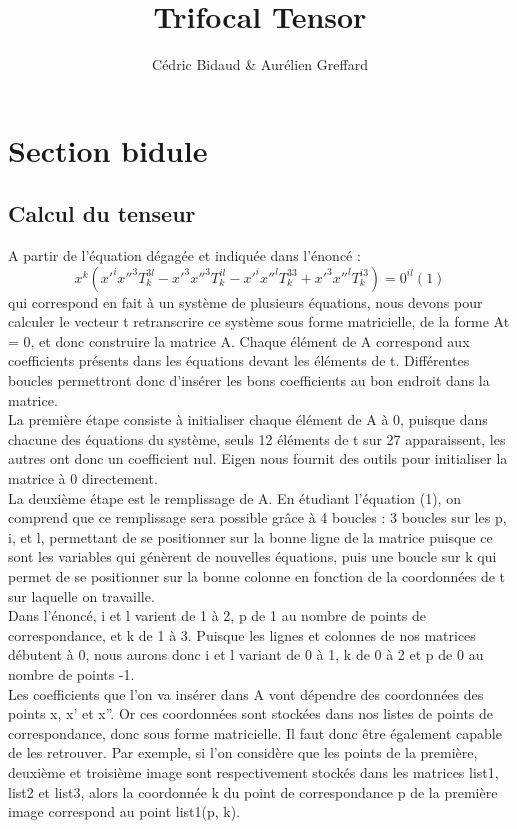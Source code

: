 \documentclass[a4paper,10pt]{report}
\title{Trifocal Tensor}
\author{Cédric Bidaud & Aurélien Greffard}
\begin{document}
\maketitle

\section{Section bidule}
\subsection{Calcul du tenseur}


A partir de l’équation dégagée et indiquée dans l’énoncé :
\[x^{k}(x'^{i}x''^{3}T^{3l}_{k} - x'^{3}x''^{3}T^{il}_{k} - x'^{i}x''^{l}T^{33}_{k} + x'^{3}x''^{l}T^{i3}_{k}) = 0^{il}  (1)\]
qui correspond en fait à un système de plusieurs équations, nous devons pour calculer le vecteur t retranscrire ce système sous forme matricielle, de la forme At = 0, et donc construire la matrice A. Chaque élément de A correspond aux coefficients présents dans les équations devant les éléments de t. Différentes boucles permettront donc d’insérer les bons coefficients au bon endroit dans la matrice.
\\

La première étape consiste à initialiser chaque élément de A à 0, puisque dans chacune des équations du système, seuls 12 éléments de t sur 27 apparaissent, les autres ont donc un coefficient nul. Eigen nous fournit des outils pour initialiser la matrice à 0 directement.
\\

La deuxième étape est le remplissage de A. En étudiant l’équation (1), on comprend que ce remplissage sera possible grâce à 4 boucles : 3 boucles sur les p, i, et l, permettant de se positionner sur la bonne ligne de la matrice puisque ce sont les variables qui génèrent de nouvelles équations, puis une boucle sur k qui permet de se positionner sur la bonne colonne en fonction de la coordonnées de t sur laquelle on travaille.
\\

Dans l’énoncé, i et l varient de 1 à 2, p de 1 au nombre de points de correspondance, et k de 1 à 3. Puisque les lignes et colonnes de nos matrices débutent à 0, nous aurons donc i et l variant de 0 à 1, k de 0 à 2 et p de 0 au nombre de points -1.
\\

Les coefficients que l’on va insérer dans A vont dépendre des coordonnées des points x, x’ et x”. Or ces coordonnées sont stockées dans nos listes de points de correspondance, donc sous forme matricielle. Il faut donc être également capable de les retrouver. Par exemple, si l’on considère que les points de la première, deuxième et troisième image sont respectivement stockés dans les matrices list1, list2 et list3, alors la coordonnée k du point de correspondance p de la première image correspond au point list1(p, k).
\\
\end{document}
